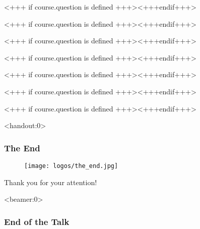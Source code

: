 \documentclass[english,xcolor=pdftex,dvipsnames]{beamer}
\begin{document}

<+++ if course.question is defined +++><+++endif+++>

% 


<+++ if course.question is defined +++><+++endif+++>


<+++ if course.question is defined +++><+++endif+++>


<+++ if course.question is defined +++><+++endif+++>


      

<+++ if course.question is defined +++><+++endif+++>


<+++ if course.question is defined +++><+++endif+++>


<+++ if course.question is defined +++><+++endif+++> 

\begin{frame}<handout:0> 
	\frametitle{The End}
	\begin{center}
		\begin{figure}
			\centering
			
			\texttt{[image: logos/the\_end.jpg]}
		\end{figure}
		Thank you for your attention!
	\end{center}
\end{frame}

\begin{frame}<beamer:0> 
	\frametitle{End of the Talk}

\end{frame}
\end{document}
